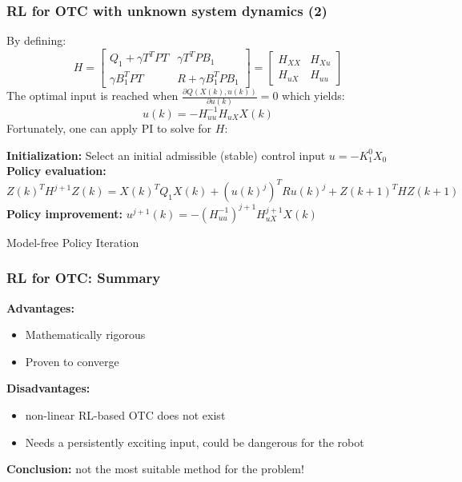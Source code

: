 \documentclass{beamer}
\begin{document}
			\begin{frame}\frametitle{RL for OTC with unknown system dynamics (2)}
				\vspace{3mm}
				\fontsize{8}{4}\selectfont 
				By defining:
				\begin{equation}
				H =  \left[\begin{array}{cc}
				Q_1+\gamma T^TPT & \gamma T^TPB_1 \\ 
				\gamma B_1^TPT & R+\gamma B_1^TPB_1
				\end{array}  \right] 
				=\left[ \begin{array}{cc}
				H_{XX} & H_{Xu} \\
				H_{uX} & H_{uu}
				\end{array} \right] 
				\end{equation}
				The optimal input is reached when $ \frac{\partial Q(X(k), u(k))}{\partial u(k)} = 0 $ which yields:
				\begin{equation}
				u(k) = -H_{uu}^{-1}H_{uX}X(k)
				\end{equation} 
				Fortunately, one can apply PI to solve for $ H $:
				\begin{algorithm}[H]
					\begin{algorithmic}[1]
						\fontsize{8}{4}\selectfont
						\STATE \textbf{Initialization:} Select an initial admissible (stable) control input $u = -K^0_1X_0$
						\REPEAT
						\STATE \textbf{Policy evaluation:} 
						\STATE $Z(k)^TH^{j+1}Z(k) = X(k)^TQ_1X(k) + (u(k)^j)^TRu(k)^j + Z(k+1)^THZ(k+1)$
						\STATE \textbf{Policy improvement:} 
						\STATE $ u^{j+1}(k) = -(H_{uu}^{-1})^{j+1} H_{uX}^{j+1}X(k) $ 
						\caption{Model-free Policy Iteration}
					\end{algorithmic}			
				\end{algorithm}
			\end{frame}
			
			\begin{frame}\frametitle{RL for OTC: Summary}				
				\vspace{3mm}
				\textbf{Advantages:}
				\begin{itemize}
					\item Mathematically rigorous
					\item Proven to converge 
				\end{itemize}
				\vspace{3mm}
				\pause
				\textbf{Disadvantages:}
				\begin{itemize}
					\item non-linear RL-based OTC does not exist 
					\item Needs a persistently exciting input, could be dangerous for the robot				
				\end{itemize}
				\pause
				\textbf{Conclusion:} not the most suitable method for the problem!
			\end{frame}				
							
\end{document}
